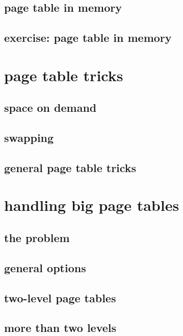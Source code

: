 \subsection{page table in memory}


\subsection{exercise: page table in memory}


\section{page table tricks}

\subsection{space on demand}


\subsection{swapping}




\subsection{general page table tricks}


\section{handling big page tables}
\subsection{the problem}


\subsection{general options}


\subsection{two-level page tables}



\subsection{more than two levels}


